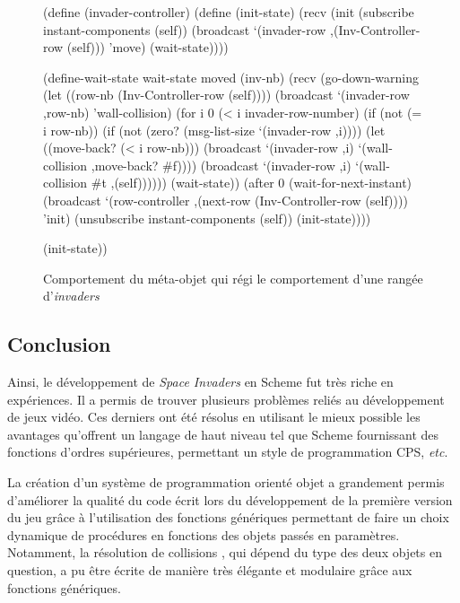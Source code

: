 \documentclass[12pt,twoside,letterpaper,francais]{book}
\newcommand{\scheme}[1]{\selectlanguage{english}{\tt #1}\selectlanguage{french}}
\begin{document}
\begin{figure}[htb!]
  \begin{schemecode}
(define (invader-controller)
  (define (init-state)
    (recv
     (init
      (subscribe instant-components (self))
      (broadcast `(invader-row ,(Inv-Controller-row (self)))
                 'move)
      (wait-state))))

  (define-wait-state wait-state moved (inv-nb)
    (recv
     (go-down-warning
      (let ((row-nb (Inv-Controller-row (self))))
        (broadcast `(invader-row ,row-nb) 'wall-collision)
        (for i 0 (< i invader-row-number)
             (if (not (= i row-nb))
                 (if (not (zero? (msg-list-size `(invader-row ,i))))
                     (let ((move-back? (< i row-nb)))
                       (broadcast `(invader-row ,i)
                                  `(wall-collision ,move-back? \#f))))
                 (broadcast `(invader-row ,i)
                            `(wall-collision  \#t ,(self))))))
      (wait-state))
     (after 0
            (wait-for-next-instant)
            (broadcast `(row-controller
                         ,(next-row (Inv-Controller-row (self))))
                       'init)
            (unsubscribe instant-components (self))
            (init-state))))

  (init-state))
  \end{schemecode}
  \caption{Comportement du méta-objet \scheme{invader-controller} qui
    régi le comportement d'une rangée d'\textit{invaders}}
  \label{Exp:inv-cnt}
\end{figure}


\FloatBarrier
\subsection{Conclusion}
Ainsi, le dévelop\-pement de \textit{Space Invaders} en Scheme fut très riche en
expériences. Il a permis de trouver plusieurs problèmes reliés au
dévelop\-pement de jeux vidéo. Ces derniers ont été résolus en utilisant
le mieux possible les avantages qu'offrent un langage de haut niveau
tel que Scheme fournissant des fonctions d'ordres supérieures,
permettant un style de programmation CPS, \textit{etc}.

La création d'un système de programmation orienté objet a grandement
permis d'améliorer la qualité du code écrit lors du dévelop\-pement de
la première version du jeu grâce à l'utilisation des fonctions
génériques permettant de faire un choix dynamique de procédures en
fonctions des objets passés en paramètres. Notamment, la résolution de
collisions , qui dépend du type des deux objets en question, a pu être
écrite de manière très élégante et modulaire grâce aux fonctions
génériques.
\end{document}
